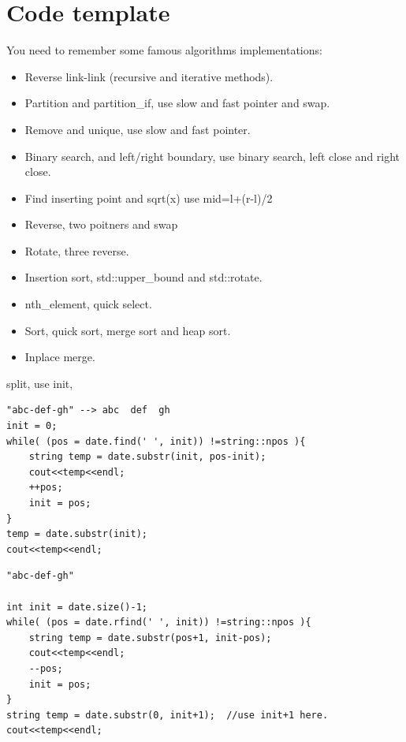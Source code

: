 \documentclass[a4paper,11pt,twoside]{book}
\begin{document}
\section{Code template}

\par You need to remember some famous algorithms implementations:
\begin{itemize}
	\item Reverse link-link (recursive and iterative methods).
	
	\item Partition and partition\_if, use slow and fast pointer and swap.
	
	\item Remove and unique, use slow and fast pointer.
	
	\item Binary search, and left/right boundary, use binary search, left close and right close.
	
	\item Find inserting point and sqrt(x) use mid=l+(r-l)/2
	
	\item Reverse, two poitners and swap
	
	\item Rotate, three reverse. 
	
	\item Insertion sort, std::upper\_bound and std::rotate.
	
	\item nth\_element, quick select.
	
	\item Sort, quick sort, merge sort and heap sort.
	
	\item Inplace merge.
\end{itemize}

	\par split, use init, 
\begin{lstlisting}
"abc-def-gh" --> abc  def  gh
init = 0;
while( (pos = date.find(' ', init)) !=string::npos ){
	string temp = date.substr(init, pos-init);
	cout<<temp<<endl;
	++pos;
	init = pos;
}
temp = date.substr(init);
cout<<temp<<endl;
\end{lstlisting}

\begin{lstlisting}
"abc-def-gh" 

int init = date.size()-1;
while( (pos = date.rfind(' ', init)) !=string::npos ){
	string temp = date.substr(pos+1, init-pos);
	cout<<temp<<endl;
	--pos;
	init = pos;
}
string temp = date.substr(0, init+1);  //use init+1 here.
cout<<temp<<endl;	
\end{lstlisting}
\end{document}
